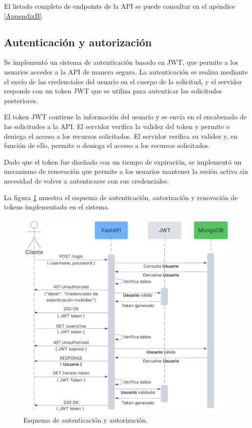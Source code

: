 El listado completo de endpoints de la API se puede consultar en el apéndice
\ref{AppendixB}.

\subsection{Autenticación y autorización}

Se implementó un sistema de autenticación basado en JWT, que permite a los
usuarios acceder a la API de manera segura. La autenticación se realiza
mediante el envío de las credenciales del usuario en el cuerpo de la solicitud,
y el servidor responde con un token JWT que se utiliza para autenticar las
solicitudes posteriores.

El token JWT contiene la información del usuario y se envía en el encabezado de
las solicitudes a la API. El servidor verifica la validez del token y permite o
deniega el acceso a los recursos solicitados. El servidor verifica su validez
y, en función de ello, permite o deniega el acceso a los recursos solicitados.

Dado que el token fue diseñado con un tiempo de expiración, se implementó un
mecanismo de renovación que permite a los usuarios mantener la sesión activa
sin necesidad de volver a autenticarse con sus credenciales.


La figura \ref{fig:esquema autenticacion} muestra el esquema de autenticación,
autorización y renovación de tokens implementado en el sistema.

\begin{figure}[H]
    \centering
    \includegraphics[width=.78\textwidth]{./Images/17.png}
    \caption{Esquema de autenticación y autorización.}
    \label{fig:esquema autenticacion}
\end{figure}

